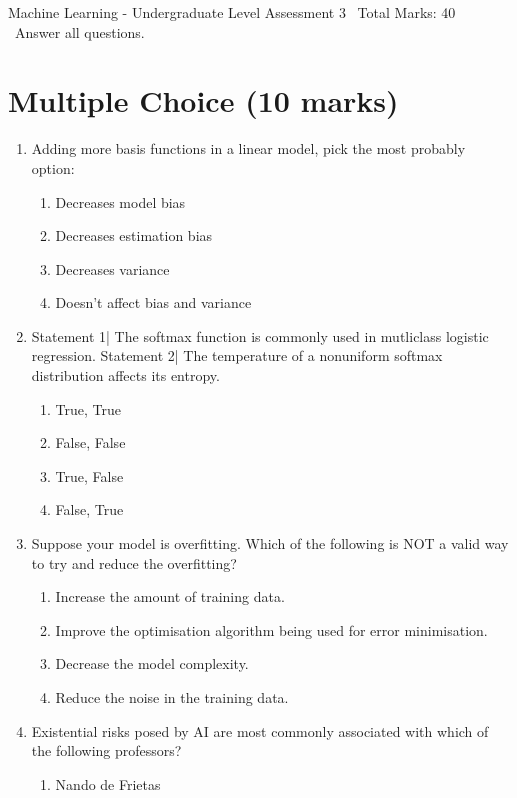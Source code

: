 \documentclass[12pt]{article}
\begin{document}
\begin{center}
Machine Learning - Undergraduate Level Assessment 3 \
Total Marks: 40 \
Answer all questions.
\end{center}

\section*{Multiple Choice (10 marks)}
\begin{enumerate}[label=\arabic*.]
\item Adding more basis functions in a linear model, pick the most probably option:
\begin{enumerate}[label=(\alph*)]
    \item Decreases model bias
    \item Decreases estimation bias
    \item Decreases variance
    \item Doesn't affect bias and variance
\end{enumerate}
\item Statement 1| The softmax function is commonly used in mutliclass logistic regression. Statement 2| The temperature of a nonuniform softmax distribution affects its entropy.
\begin{enumerate}[label=(\alph*)]
    \item True, True
    \item False, False
    \item True, False
    \item False, True
\end{enumerate}
\item Suppose your model is overfitting. Which of the following is NOT a valid way to try and reduce the overfitting?
\begin{enumerate}[label=(\alph*)]
    \item Increase the amount of training data.
    \item Improve the optimisation algorithm being used for error minimisation.
    \item Decrease the model complexity.
    \item Reduce the noise in the training data.
\end{enumerate}
\item Existential risks posed by AI are most commonly associated with which of the following professors?
\begin{enumerate}[label=(\alph*)]
    \item Nando de Frietas

\end{enumerate}
\end{enumerate}
\end{document}
